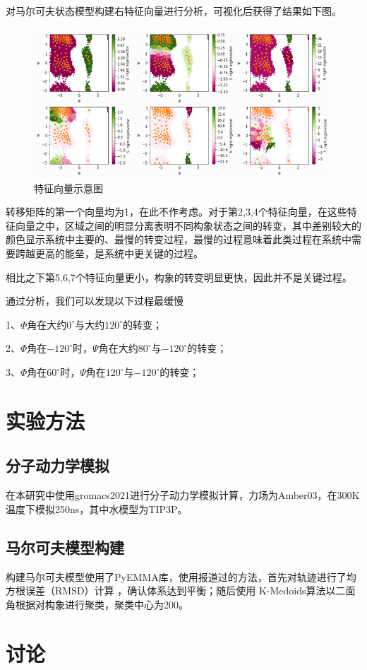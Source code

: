 \documentclass[a4paper]{article}
\begin{document}
\begin{CJK}{UTF8}{gbsn}
	对马尔可夫状态模型构建右特征向量进行分析，可视化后获得了结果如下图。
\begin{figure}[H]
\centering
\includegraphics[scale=0.68]{right.png}
\caption{特征向量示意图}
\end{figure}
	转移矩阵的第一个向量均为1，在此不作考虑。对于第2,3,4个特征向量，在这些特征向量之中，区域之间的明显分离表明不同构象状态之间的转变，其中差别较大的颜色显示系统中主要的、最慢的转变过程，最慢的过程意味着此类过程在系统中需要跨越更高的能垒，是系统中更关键的过程。

	相比之下第5,6,7个特征向量更小，构象的转变明显更快，因此并不是关键过程。
	
	通过分析，我们可以发现以下过程最缓慢

	1、$\Phi$角在大约$0^{\circ}$与大约$120^{\circ}$的转变；

	2、$\Phi$角在$-120^{\circ}$时，$\Psi$角在大约$80^{\circ}$与$-120^{\circ}$的转变；

	3、$\Phi$角在$60^{\circ}$时，$\Psi$角在$120^{\circ}$与$-120^{\circ}$的转变；





\section{实验方法}
	\subsection{分子动力学模拟}
在本研究中使用gromacs2021进行分子动力学模拟计算，力场为Amber03，在300K温度下模拟250ns，其中水模型为TIP3P。

	\subsection{马尔可夫模型构建}
构建马尔可夫模型使用了PyEMMA库，使用报道过的方法，首先对轨迹进行了均方根误差（RMSD）计算 ，确认体系达到平衡；随后使用 K-Medoids算法以二面角根据对构象进行聚类，聚类中心为200。


\section{讨论}



\end{CJK}
\end{document}

